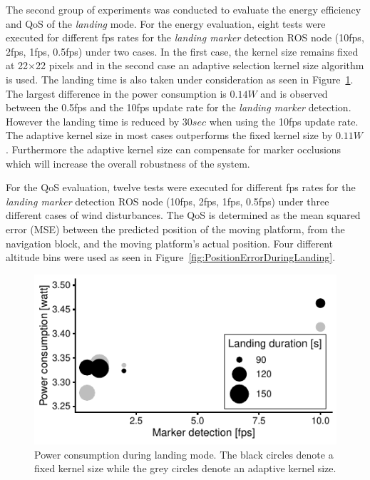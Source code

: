 \documentclass[conference]{IEEEtran}
\begin{document}
The second group of experiments was conducted to evaluate the 
energy efficiency and QoS of the \emph{landing} mode. 
For the energy evaluation, eight tests were executed for different 
fps rates for the \emph{landing marker} detection ROS node 
(10fps, 2fps, 1fps, 0.5fps) under two cases. 
In the first case, the kernel size remains fixed at 
22$\times$22 pixels and in the second case an adaptive selection 
kernel size algorithm is used. 
%
The landing time is also taken under consideration as seen in
Figure~\ref{fig:PowerDuringLanding}. The largest difference in the
power consumption is $0.14 W$ and is observed between the 0.5fps and
the 10fps update rate for the \emph{landing marker} detection. However
the landing time is reduced by $30 sec$ when using the 10fps update
rate. The adaptive kernel size in most cases outperforms the fixed
kernel size by $0.11 W$. Furthermore the adaptive kernel size can
compensate for marker occlusions which will increase the overall
robustness of the system.

For the QoS evaluation, twelve tests were executed for different 
fps rates for the \emph{landing marker} detection ROS node 
(10fps, 2fps, 1fps, 0.5fps) under three different cases of wind
disturbances. The QoS is determined as the  mean squared error (MSE) 
between the predicted position of the moving platform, 
from the navigation block, and the moving platform's actual position. 
Four different altitude bins were used as seen in Figure~\ref{fig:PositionErrorDuringLanding}.

\begin{figure}[h]
\centering
\includegraphics{data_visualization/PowerLanding.pdf}
\caption{Power consumption during landing mode. 
The black circles denote a fixed kernel size while the grey circles denote an adaptive kernel size.}
\label{fig:PowerDuringLanding}
\end{figure}
\end{document}
